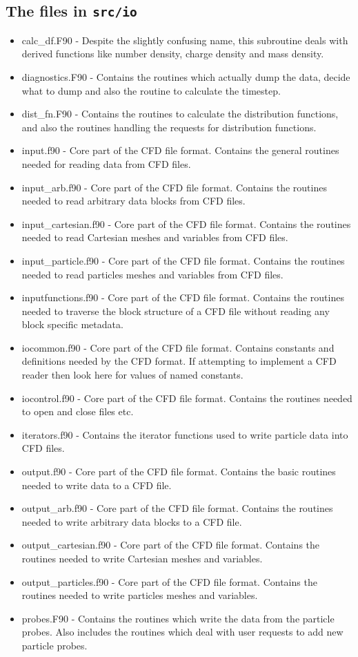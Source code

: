 \documentclass[12pt,a4paper]{article}
\newcommand{\inlinecode}[1]{{\color{warwickred} \bf\texttt{#1}}}
\begin{document}
\subsection{The files in \inlinecode{src/io}}
\begin{itemize}
\item calc\_df.F90 - Despite the slightly confusing name, this subroutine
  deals with derived functions like number density, charge density and mass
  density.
\item diagnostics.F90 - Contains the routines which actually dump the data,
  decide what to dump and also the routine to calculate the timestep.
\item dist\_fn.F90 - Contains the routines to calculate the distribution
  functions, and also the routines handling the requests for distribution
  functions.
\item input.f90 - Core part of the CFD file format. Contains the general
  routines needed for reading data from CFD files.
\item input\_arb.f90 - Core part of the CFD file format. Contains the routines
  needed to read arbitrary data blocks from CFD files.
\item input\_cartesian.f90 - Core part of the CFD file format. Contains the
  routines needed to read Cartesian meshes and variables from CFD files.
\item input\_particle.f90 - Core part of the CFD file format. Contains the
  routines needed to read particles meshes and variables from CFD files.
\item inputfunctions.f90 - Core part of the CFD file format. Contains the
  routines needed to traverse the block structure of a CFD file without
  reading any block specific metadata.
\item iocommon.f90 - Core part of the CFD file format. Contains constants and
  definitions needed by the CFD format. If attempting to implement a CFD
  reader then look here for values of named constants.
\item iocontrol.f90 - Core part of the CFD file format. Contains the routines
  needed to open and close files etc.
\item iterators.f90 - Contains the iterator functions used to write particle
  data into CFD files.
\item output.f90 - Core part of the CFD file format. Contains the basic
  routines needed to write data to a CFD file.
\item output\_arb.f90 - Core part of the CFD file format. Contains the
  routines needed to write arbitrary data blocks to a CFD file.
\item output\_cartesian.f90 - Core part of the CFD file format. Contains the
  routines needed to write Cartesian meshes and variables.
\item output\_particles.f90 - Core part of the CFD file format. Contains the
  routines needed to write particles meshes and variables.
\item probes.F90 - Contains the routines which write the data from the
  particle probes. Also includes the routines which deal with user requests to
  add new particle probes.
\end{itemize}
\end{document}
